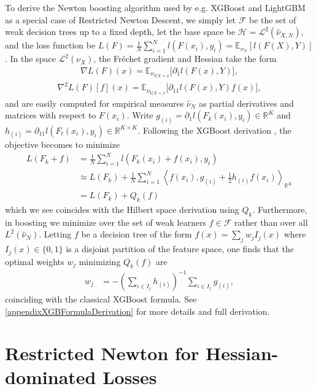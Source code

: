 \documentclass{article}
\theoremstyle{plain}
\theoremstyle{definition}
\theoremstyle{remark}
\newcommand{\bbR}{\mathbb{R}}
\newcommand{\E}{\mathbb{E}}
\begin{document}
To derive the Newton boosting algorithm used by e.g. XGBoost and LightGBM as a special case of Restricted Newton Descent, we simply let $\mathcal{F}$ be the set of weak decision trees up to a fixed depth, let the base space be $\mathcal{H} = \mathcal{L}^2(\widehat{\nu}_{X,N})$, and the loss function be $L(F) = \frac{1}{N} \sum_{i=1}^N l(F(x_i), y_i) = \E_{\nu_N}[l(F(X),Y)]$. In the space $\mathcal{L}^2(\nu_X)$, the Fréchet gradient and Hessian take the form
\begin{align}
    \nabla L (F)(x)  =  \E_{\nu_{Y|X=x}}\big[ \partial_{1} l(F(x), Y) \big],
\end{align}
\begin{align}
    \nabla^2 L (F)[f](x)  =  \E_{\nu_{Y|X=x}}\big[ \partial_{11} l(F(x), Y) f(x) \big],
\end{align}
and are easily computed for empirical measures $\widehat{\nu}_N$ as partial derivatives and matrices with respect to $F(x_i)$. Write $g_{(i)} = \partial_1 l(F_k(x_i), y_i) \in \bbR^K$ and $h_{(i)} = \partial_{11} l(F_t(x_i), y_i) \in \bbR^{K\times K}$. Following the XGBoost derivation \cite{2016XGBoost}, the objective becomes to minimize
\begin{align*}
        L(F_k+f) 
        &= \frac{1}{N}\sum_{i=1}^N l(F_k(x_i)+f(x_i), y_i) \\
        &\approx  L(F_k) + \frac{1}{N}\sum_{i=1}^N \left\langle f(x_i), g_{(i)} + \frac{1}{2} h_{(i)} f(x_i) \right\rangle_{\mathbb{R}^K} \\
        &= L(F_k) + Q_k(f)
\end{align*}
which we see coincides with the Hilbert space derivation using $Q_k$. Furthermore, in boosting we minimize over the set of weak learners $f \in \mathcal{F}$ rather than over all $L^2(\widehat{\nu}_N)$. Letting $f$ be a decision tree of the form $f(x) = \sum_j w_j I_j(x)$ where $I_j(x) \in \{0, 1\}$ is a disjoint partition of the feature space, one finds that the optimal weights $w_j$ minimizing $Q_k(f)$ are
\begin{align*}
    w_j &=  -\left( \sum_{i \in I_j} h_{(i)} \right)^{-1} \sum_{i \in I_j} g_{(i)},
\end{align*}
coinciding with the classical XGBoost formula. See \cref{appendixXGBFormulaDerivation} for more details and full derivation.



\section{Restricted Newton for Hessian-dominated Losses}\label{secVanillaNewtonBoosting}
\end{document}
